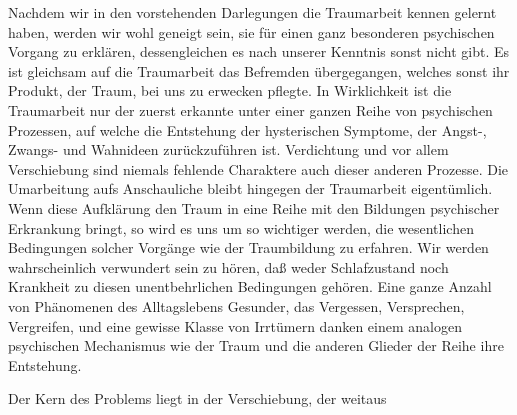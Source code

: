 \documentclass[twoside=true,titlepage=false,open=any, parskip=never, fontsize=10pt, headings=small, chapterprefix=false, appendixprefix=false]{scrbook}
\begin{document}
        \pstart
        Nachdem wir in den vorstehenden Darlegungen die Traumarbeit kennen
               gelernt haben, werden wir wohl geneigt sein, sie für einen ganz besonderen
               psychischen Vorgang zu erklären, dessengleichen es nach unserer Kenntnis sonst
               nicht gibt. Es ist gleichsam auf die Traumarbeit das Befremden
               übergegangen, welches sonst ihr Produkt, der Traum, bei uns zu erwecken
               pflegte. In Wirklichkeit ist die Traumarbeit nur der zuerst erkannte unter einer
               ganzen Reihe von psychischen Prozessen, auf welche die Entstehung der
               hysterischen Symptome, der Angst-, Zwangs- und Wahnideen zurückzuführen ist.
               Verdichtung und vor allem Verschiebung sind niemals fehlende Charaktere
               auch dieser anderen Prozesse. Die Umarbeitung aufs Anschauliche bleibt
               hingegen der Traumarbeit eigentümlich. Wenn diese Aufklärung den Traum in eine
               Reihe mit den Bildungen psychischer Erkrankung bringt, so wird es uns
               um so wichtiger werden, die wesentlichen Bedingungen solcher Vorgänge wie der
               Traumbildung zu erfahren. Wir werden wahrscheinlich verwundert sein zu
               hören, daß weder Schlafzustand noch Krankheit zu diesen unentbehrlichen Bedingungen gehören. Eine ganze Anzahl von Phänomenen des
               Alltagslebens Gesunder, das Vergessen, Versprechen, Vergreifen, und
               eine gewisse Klasse von Irrtümern danken einem analogen psychischen Mechanismus
               wie der Traum und die anderen Glieder der Reihe ihre Entstehung.
        \pend
    
            
        \pstart
        Der Kern des Problems liegt in der Verschiebung, der weitaus
        \pend
    
         
            
            
            
\end{document}

